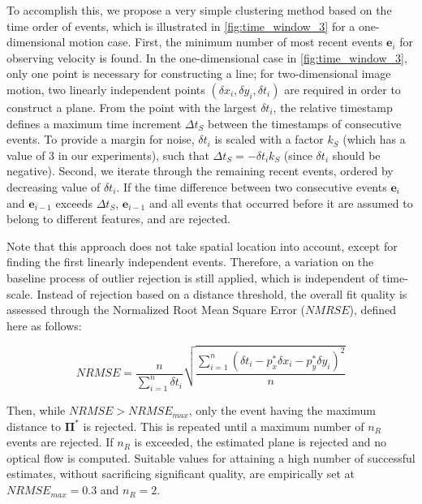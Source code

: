 To accomplish this, we propose a very simple clustering method based on the time order of events, which is illustrated in \cref{fig:time_window_3} for a one-dimensional motion case. First, the minimum number of most recent events $\mathbf{e}_i$ for observing velocity is found. In the one-dimensional case in \cref{fig:time_window_3}, only one point is necessary for constructing a line; for two-dimensional image motion, two linearly independent points $(\delta x_i,\delta y_i,\delta t_i)$ are required in order to construct a plane. From the point with the largest $\delta t_i$, the relative timestamp defines a maximum time increment $\Delta t_S$ between the timestamps of consecutive events. To provide a margin for noise, $\delta t_i$ is scaled with a factor $k_S$ (which has a value of 3 in our experiments), such that $\Delta t_S=-\delta t_i k_S$ (since $\delta t_i$ should be negative). Second, we iterate through the remaining recent events, ordered by decreasing value of $\delta t_i$. If the time difference between two consecutive events $\mathbf{e}_i$ and $\mathbf{e}_{i-1}$ exceeds $\Delta t_S$, $\mathbf{e}_{i-1}$ and all events that occurred before it are assumed to belong to different features, and are rejected. 

Note that this approach does not take spatial location into account, except for finding the first linearly independent events. Therefore, a variation on the baseline process of outlier rejection is still applied, which is independent of time-scale. Instead of rejection based on a distance threshold, the overall fit quality is assessed through the Normalized Root Mean Square Error ($\mathit{NMRSE}$), defined here as follows:

\begin{equation}
\label{eq:NRMSE}
\mathit{NRMSE} = \frac{n}{{\sum\limits_{i = 1}^n {\delta {t_i}} }}\sqrt {\frac{{\sum\limits_{i = 1}^n {{{\left( {\delta {t_i} - p_x^*\delta {x_i} - p_y^*\delta {y_i}} \right)}^2}} }}{n}} 
\end{equation}

Then, while $\mathit{NRMSE} > \mathit{NRMSE_{max}}$, only the event having the maximum distance to $\mathbf{\Pi}^*$ is rejected. This is repeated until a maximum number of $n_{R}$ events are rejected. If $n_R$ is exceeded, the estimated plane is rejected and no optical flow is computed. Suitable values for attaining a high number of successful estimates, without sacrificing significant quality, are empirically set at $\mathit{NRMSE_{max}}=0.3$ and $n_R=2$. 

